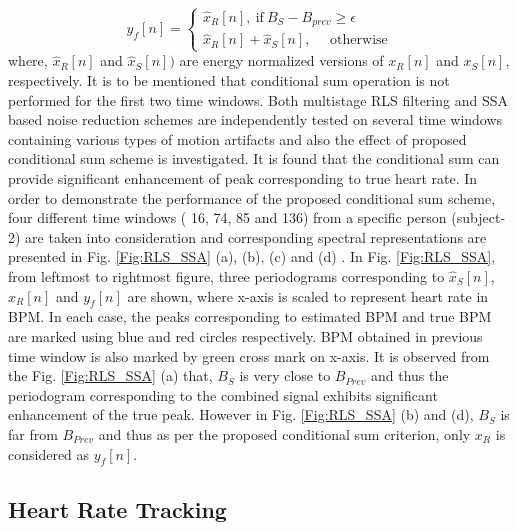 \documentclass[final,3p,times,authoryear]{elsarticle}
\begin{document}
\begin{equation}
y_{f}[n]= 
\begin{cases}

\hat{x}_{R}[n],\ \text{if} \ B_{S}-B_{prev} \geq  \epsilon
\\
\hat{x}_{R}[n] + \hat{x}_{S}[n],\ \ \ \ \ \ \text{otherwise}
\end{cases}
\end{equation}
where, $\hat{x}_R[n]$ and $\hat{x}_S[n])$ are energy normalized versions of $x_R[n]$ and $x_S[n]$, respectively. It is to be mentioned that conditional sum operation is not performed for the first two time windows. Both multistage RLS filtering and SSA based noise reduction schemes are independently tested on several time windows containing various types of motion artifacts and also the effect of proposed conditional sum scheme is investigated. It is found that the conditional sum can provide significant  enhancement of peak corresponding to true heart rate. In order to demonstrate the performance of the proposed conditional sum scheme, four different time windows ( 16, 74, 85 and 136) from a specific person (subject-2) are taken into consideration and corresponding spectral representations are presented in Fig. \ref{Fig:RLS_SSA} (a), (b), (c) and (d) . In Fig. \ref{Fig:RLS_SSA}, from leftmost to rightmost figure, three periodograms corresponding to $\hat{x}_{S}[n]$, $\hat{x}_{R}[n]$ and  $y_{f}[n]$ are shown, where x-axis is scaled to represent heart rate in BPM. In each case, the peaks corresponding to estimated BPM and true BPM are marked using blue and  red circles respectively. BPM obtained in previous time window is also marked by green cross mark on x-axis.  It is observed from the Fig. \ref{Fig:RLS_SSA} (a) that, $B_S$ is very close to $B_{Prev}$ and thus the periodogram corresponding to the combined signal exhibits significant enhancement of the true peak. However in Fig. \ref{Fig:RLS_SSA} (b) and (d), $B_S$ is far from $B_{Prev}$ and thus as per the proposed conditional sum criterion, only $x_{R}$ is considered as $y_f[n]$.   








\subsection{Heart Rate Tracking}
\end{document}
